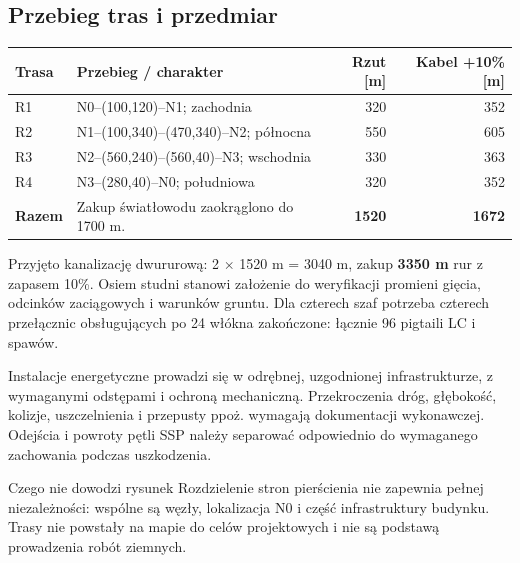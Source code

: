 \subsection{Przebieg tras i przedmiar}
\begin{tabularx}{\linewidth}{@{}P{18mm}Y r r@{}}
\toprule\textbf{Trasa} & \textbf{Przebieg / charakter} & \textbf{Rzut [m]} & \textbf{Kabel +10\% [m]}\\\midrule
R1 & N0--(100,120)--N1; zachodnia & 320 & 352\\
R2 & N1--(100,340)--(470,340)--N2; północna & 550 & 605\\
R3 & N2--(560,240)--(560,40)--N3; wschodnia & 330 & 363\\
R4 & N3--(280,40)--N0; południowa & 320 & 352\\\midrule
\textbf{Razem} & Zakup światłowodu zaokrąglono do 1700 m. & \textbf{1520} & \textbf{1672}\\\bottomrule
\end{tabularx}

Przyjęto kanalizację dwururową: 2 $\times$ 1520 m = 3040 m, zakup \textbf{3350 m} rur z zapasem 10\%. Osiem studni stanowi założenie do weryfikacji promieni gięcia, odcinków zaciągowych i warunków gruntu. Dla czterech szaf potrzeba czterech przełącznic obsługujących po 24 włókna zakończone: łącznie 96 pigtaili LC i spawów.

Instalacje energetyczne prowadzi się w odrębnej, uzgodnionej infrastrukturze, z wymaganymi odstępami i ochroną mechaniczną. Przekroczenia dróg, głębokość, kolizje, uszczelnienia i przepusty ppoż. wymagają dokumentacji wykonawczej. Odejścia i powroty pętli SSP należy separować odpowiednio do wymaganego zachowania podczas uszkodzenia.
\begin{note}{Czego nie dowodzi rysunek}
Rozdzielenie stron pierścienia nie zapewnia pełnej niezależności: wspólne są węzły, lokalizacja N0 i część infrastruktury budynku. Trasy nie powstały na mapie do celów projektowych i nie są podstawą prowadzenia robót ziemnych.
\end{note}
